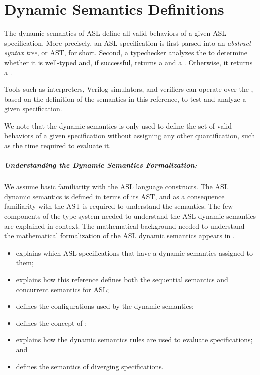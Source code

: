 \chapter{Dynamic Semantics Definitions\label{chap:Semantics}}

The dynamic semantics of ASL define all valid behaviors of a given ASL specification.
More precisely, an ASL specification is first parsed into an \emph{abstract syntax tree},
or AST, for short. Second, a typechecker analyzes the \emph{\untypedast} to determine whether it
is well-typed and, if successful, returns a \emph{\staticenvironmentterm{}} and a \emph{\typedast}.
Otherwise, it returns a \typingerrorterm{}.

Tools such as interpreters, Verilog simulators, and verifiers can operate over the \typedast,
based on the definition of the semantics in this reference, to test and analyze a given specification.

We note that the dynamic semantics is only used to define the set of valid behaviors
of a given specification without assigning any other quantification, such as the time
required to evaluate it.

\paragraph{Understanding the Dynamic Semantics Formalization:}
We assume basic familiarity with the ASL language constructs.
The ASL dynamic semantics is defined in terms of its AST,
and as a consequence familiarity with the AST is required to understand the semantics.
The few components of the type system needed to understand the ASL dynamic semantics are explained in context.
The mathematical background needed to understand the mathematical formalization
of the ASL dynamic semantics appears in .

\ChapterOutline
\begin{itemize}
  \item {} explains which ASL specifications that have a dynamic semantics
        assigned to them;
  \item {} explains how this reference defines both the
        sequential semantics and concurrent semantics for ASL;
  \item {} defines the configurations used by the dynamic semantics;
  \item {} defines the concept of \nativevalues{};
  \item {} explains how the dynamic semantics rules are used to evaluate specifications; and
  \item {} defines the semantics of diverging specifications.
\end{itemize}

